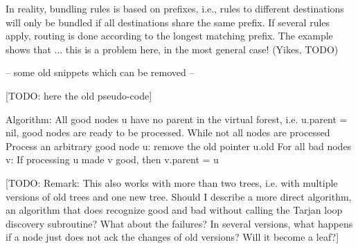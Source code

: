 In reality, bundling rules is based on prefixes, i.e., rules to different destinations will only be bundled if all destinations share the same prefix. If several rules apply, routing is done according to the longest matching prefix. The example shows that ... this is a problem here, in the most general case! (Yikes, TODO)


-- some old snippets which can be removed --

[TODO: here the old pseudo-code]

Algorithm:
All good nodes u have no parent in the virtual forest, i.e. u.parent = nil, good nodes are ready to be processed.
While not all nodes are processed
	Process an arbitrary good node u: remove the old pointer u.old
	For all bad nodes v:
		If processing u made v good, then v.parent = u

[TODO: Remark: This also works with more than two trees, i.e. with multiple versions of old trees and one new tree. Should I describe a more direct algorithm, an algorithm that does recognize good and bad without calling the Tarjan loop discovery subroutine? What about the failures? In several versions, what happens if a node just does not ack the changes of old versions? Will it become a leaf?]


